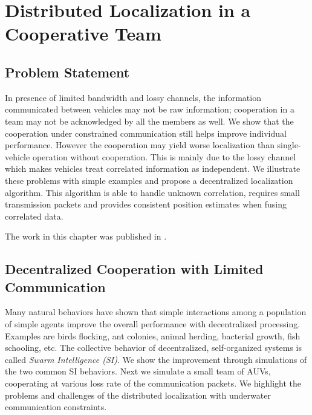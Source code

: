 \chapter{Distributed Localization in a Cooperative Team}
\label{ch:distributed}



\section{Problem Statement}

In presence of limited bandwidth and lossy channels, the information communicated between vehicles may not be raw information; cooperation in a team may not be acknowledged by all the members as well. We show that the cooperation under constrained communication still helps improve individual performance. However the cooperation may yield worse localization than single-vehicle operation without cooperation. This is mainly due to the lossy channel which makes vehicles treat correlated information as independent. We illustrate these problems with simple examples and propose a decentralized localization algorithm. This algorithm is able to handle unknown correlation, requires small transmission packets and provides consistent position estimates when fusing correlated data.

The work in this chapter was published in \cite{Gao2016}.

\section{Decentralized Cooperation with Limited Communication}

Many natural behaviors have shown that simple interactions among a population of simple agents improve the overall performance with decentralized processing. Examples are birds flocking, ant colonies, animal herding, bacterial growth, fish schooling, etc. The collective behavior of decentralized, self-organized systems is called \textit{Swarm Intelligence (SI)}. We show the improvement through simulations of the two common SI behaviors. Next we simulate a small team of AUVs, cooperating at various loss rate of the communication packets. We highlight the problems and challenges of the distributed localization with underwater communication constraints.

